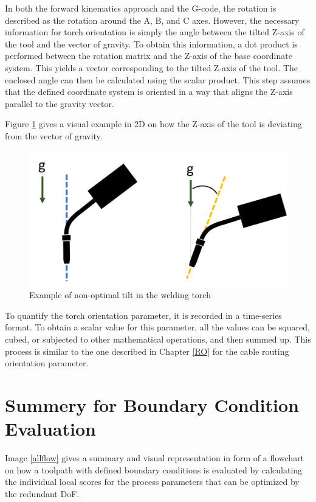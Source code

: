 In both the forward kinematics approach and the G-code, the rotation is described as the rotation around the A, B, and C axes. However, the necessary information for torch orientation is simply the angle between the tilted Z-axis of the tool and the vector of gravity. To obtain this information, a dot product is performed between the rotation matrix and the Z-axis of the base coordinate system. This yields a vector corresponding to the tilted Z-axis of the tool. The enclosed angle can then be calculated using the scalar product. This step assumes that the defined coordinate system is oriented in a way that aligns the Z-axis parallel to the gravity vector.

Figure \ref{tilt} gives a visual example in 2D on how the Z-axis of the tool is deviating from the vector of gravity.

\begin{figure}[H]
	\centerline{\includegraphics[width=.5\textwidth]{figures/ttilt.png}}
	\caption{Example of non-optimal tilt in the welding torch}
	\label{tilt}
\end{figure}

To quantify the torch orientation parameter, it is recorded in a time-series format. To obtain a scalar value for this parameter, all the values can be squared, cubed, or subjected to other mathematical operations, and then summed up. This process is similar to the one described in Chapter \ref{RO} for the cable routing orientation parameter.


\newpage
\section{Summery for Boundary Condition Evaluation}



Image \ref{allflow} gives a summary and visual representation in form of a flowchart on how a toolpath with defined boundary conditions is evaluated by calculating the individual local scores for the process parameters that can be optimized by the redundant DoF.

